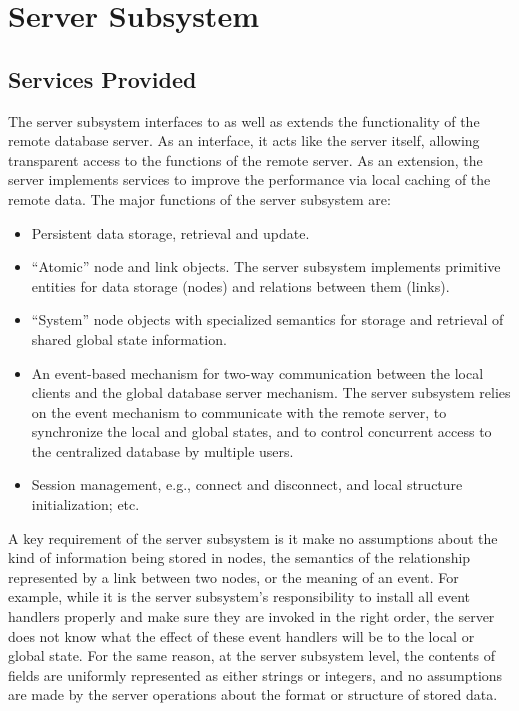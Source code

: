 \section{Server Subsystem}

\subsection{Services Provided}

The server subsystem interfaces to as well as extends the functionality of
the remote database server. As an interface, it acts like the server
itself, allowing transparent access to the functions of the remote server.
As an extension, the server implements services to improve the performance
via local caching of the remote data.   The major functions of the 
server subsystem are:
\begin{itemize}
\item  Persistent data storage, retrieval and update. 
  
\item ``Atomic'' node and link objects. The server subsystem implements
  primitive entities for data storage (nodes) and relations between them
  (links).

\item ``System'' node objects with specialized semantics for storage
and retrieval of shared global state information.
  
\item An event-based mechanism for two-way communication 
  between the local clients and the global database server mechanism.
  The server subsystem relies on the event mechanism to communicate with
the remote server, to synchronize the local and global states, and to control
concurrent access to the centralized database by multiple users.

\item Session management, e.g., connect and disconnect, and local
  structure initialization; etc.
\end{itemize}

A key requirement of the server subsystem is it make no assumptions about
the kind of information being stored in nodes, the semantics of the
relationship represented by a link between two nodes, or the meaning of an
event. For example, while it is the server subsystem's responsibility to
install all event handlers properly and make sure they are invoked in the right
order, the server does not know what the effect of these event handlers will
be to the local or global state.  For the same reason, at the server subsystem
level, the contents of fields are uniformly represented as either strings or
integers, and no assumptions are made by the server operations about the
format or structure of stored data. 


